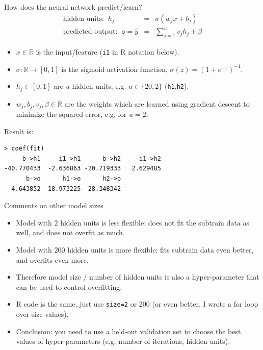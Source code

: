 \documentclass[12pt]{article}
\begin{document}
{How does the neural network predict/learn?}
  \begin{eqnarray*}
    \text{hidden units: }\ h_j &=& \sigma(w_j x + b_j) \\
    \text{predicted output: }\  \texttt{o} = \hat y &=& \sum_{j=1}^u v_j h_j + \beta
  \end{eqnarray*}
  \begin{itemize}
  \item $x\in\mathbb R$ is the input/feature (\texttt{i1} in R notation below).
  \item $\sigma:\mathbb R\rightarrow [0,1]$ is the sigmoid activation
    function, $\sigma(z)=(1+e^{-z})^{-1}$.
  \item $h_j\in[0,1]$ are $u$ hidden units, e.g. $u\in\{20, 2\}$ (\texttt{h1},\texttt{h2}).
  \item $w_j,b_j,v_j,\beta\in\mathbb R$ are the weights which are
    learned using gradient descent to minimize the squared error, e.g. for $u=2$:
  \end{itemize}
  Result is:
\begin{verbatim}
> coef(fit)
     b->h1     i1->h1      b->h2     i1->h2 
-40.770433  -2.636863 -20.719333   2.629485 
      b->o      h1->o      h2->o 
  4.643852  18.973225  28.348342 
\end{verbatim}


{Comments on other model sizes}
  \begin{itemize}
  \item Model with 2 hidden units is less flexible: does not fit the subtrain
    data as well, and does not overfit as much.
  \item Model with 200 hidden units is more flexible: fits subtrain
    data even better, and overfits even more.
  \item Therefore model size / number of hidden units is also a
    hyper-parameter that can be used to control overfitting.
  \item R code is the same, just use \texttt{size=2} or 200 (or even
    better, I wrote a for loop over size values).
  \item Conclusion: you need to use a held-out validation set to
    choose the best values of hyper-parameters (e.g. number of
    iterations, hidden units).
  \end{itemize}

\end{document}
